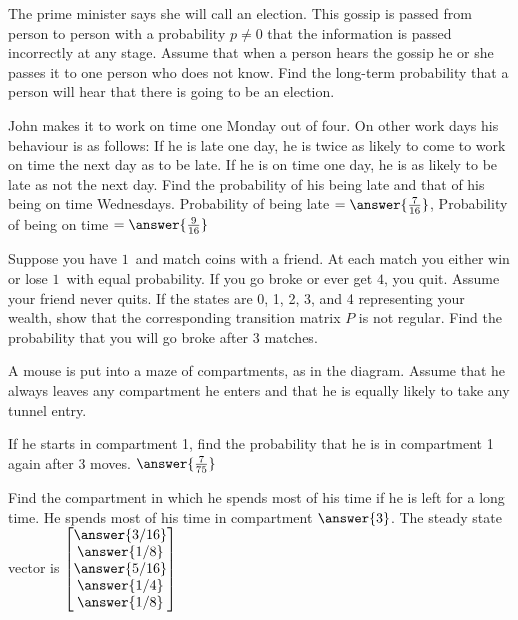 \documentclass{ximera}
\begin{document}
\begin{problem}\label{prob:election}
The prime minister says she will call an election. This gossip is passed from person to person with a probability $p \neq 0$ that the information is passed incorrectly at any stage. Assume that when a person hears the gossip he or she passes it to one person who does not know. Find the long-term probability that a person will hear that there is going to be an election.
\end{problem}

\begin{problem}\label{prob:late4work}
John makes it to work on time one Monday out of four. On other work days his behaviour is as follows: If he is late one day, he is twice as likely to come to work on time the next day as to be late. If he is on time one day, he is as likely to be late as not the next day. Find the probability of his being late and that of his being on time Wednesdays.
Probability of being late $= \answer{\frac{7}{16}}$, Probability of being on time $= \answer{\frac{9}{16}}$
\end{problem}

\begin{problem}\label{prob:matchcoins}
Suppose you have $1$\textcent\ and match coins with a friend. At each match you either win or lose $1$\textcent\ with equal probability. If you go broke or ever get $4$\textcent, you quit. Assume your friend never quits. If the states are 0, 1, 2, 3, and 4 representing your wealth, show that the corresponding transition matrix $P$ is not regular. Find the probability that you will go broke after $3$ matches.
\end{problem}

\begin{problem}
A mouse is put into a maze of compartments, as in the diagram. Assume that he always leaves any compartment he enters and that he is equally likely to take any tunnel entry.

%

\begin{problem}\label{prob:mouse1} 
If he starts in compartment 1, find the probability that he is in compartment 1 again after $3$ moves.
$\answer{\frac{7}{75}}$
\end{problem}
\begin{problem}\label{prob:mouse2} 
Find the compartment in which he spends most of his time if he is left for a long time.
He spends most of his time in compartment $\answer{3}$.  The steady state vector is $\begin{bmatrix}
\answer{3/16} \\
\answer{1/8} \\
\answer{5/16} \\
\answer{1/4} \\
\answer{1/8}
\end{bmatrix}$
\end{problem}
\end{problem}
\end{document}
